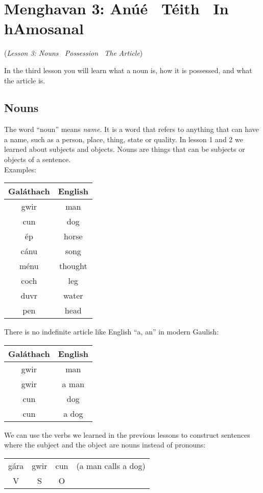\section{Menghavan 3: An\'{u}\'{e} \textendash\ T\'{e}ith \textendash\ In hAmosanal}
(\textit{Lesson 3: Nouns \textendash\ Possession \textendash\ The Article})

In the third lesson you will learn what a noun is, how it is possessed, and what the article is.\\

\subsection{Nouns}

The word ``noun'' means \textit{name}. It is a word that refers to anything that can have a name, such as a person, place, thing, state or quality. In lesson 1 and 2 we learned about subjects and objects. Nouns are things that can be subjects or objects of a sentence.\\

Examples:
\begin{table}[H]
\centering
\begin{tabu}{c|c}
  \textbf{Gal\'{a}thach} & \textbf{English}\\
  \toprule
  gwir & man\\
  cun & dog\\
  \'{e}p & horse\\
  c\'{a}nu & song\\
  m\'{e}nu & thought\\
  coch & leg\\
  duvr & water\\
  pen & head
\end{tabu}
\label{examples_nouns}
\end{table}

There is no indefinite article like English ``a, an'' in modern Gaulish:
\begin{table}[H]
\centering
\begin{tabu}{c|c}
  \textbf{Gal\'{a}thach} & \textbf{English}\\
  \toprule
  gwir & man\\
  gwir & a man\\
  cun & dog\\
  cun & a dog
\end{tabu}
\label{examples_no_indefinite_article}
\end{table}

We can use the verbs we learned in the previous lessons to construct sentences where the subject and the object are nouns instead of pronouns:
\begin{table}[H]
\begin{tabu}{cccc}
  g\'{a}ra & gwir & cun & (a man calls a dog)\\
  V & S & O &
\end{tabu}
\label{examples_vso}
\end{table}

